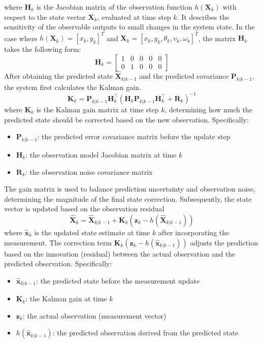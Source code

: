 \documentclass[12pt,a4paper]{article}
\numberwithin{equation}{section}
\begin{document}
\noindent where $\mathbf{H}_k$ is the Jacobian matrix of the observation function $h(\mathbf{X}_k)$ with respect to the state vector $\mathbf{X}_k$, evaluated at time step $k$. It describes the sensitivity of the observable outputs to small changes in the system state. In the case where $h(\mathbf{X}_k) = [x_k, y_k]^T$ and $\mathbf{X}_k = [x_k, y_k, \theta_k, v_k, \omega_k]^T$, the matrix $\mathbf{H}_k$ takes the following form:
\[
\mathbf{H}_k =
\begin{bmatrix}
1 & 0 & 0 & 0 & 0 \\
0 & 1 & 0 & 0 & 0
\end{bmatrix}
\]
After obtaining the predicted state \(\hat{\mathbf{X}}_{k|k-1}\) and the predicted covariance \(\mathbf{P}_{k|k-1}\), the system first calculates the Kalman gain.
\begin{equation}
\mathbf{K}_k = \mathbf{P}_{k|k-1} \mathbf{H}_k^\top 
\left( \mathbf{H}_k \mathbf{P}_{k|k-1} \mathbf{H}_k^\top + \mathbf{R}_k \right)^{-1}
\label{eq:kalman_gain}
\end{equation}
\noindent
where $\mathbf{K}_k$ is the Kalman gain matrix at time step $k$, determining how much the predicted state should be corrected based on the new observation. Specifically:
\begin{itemize}
  \item $\mathbf{P}_{k|k-1}$: the predicted error covariance matrix before the update step
  \item $\mathbf{H}_k$: the observation model Jacobian matrix at time $k$
  \item $\mathbf{R}_k$: the observation noise covariance matrix
\end{itemize}
The gain matrix is used to balance prediction uncertainty and observation noise, determining the magnitude of the final state correction. Subsequently, the state vector is updated based on the observation residual
\begin{equation}
\hat{\mathbf{X}}_k = \hat{\mathbf{X}}_{k|k-1} + \mathbf{K}_k 
\left( \mathbf{z}_k - h(\hat{\mathbf{X}}_{k|k-1}) \right)
\label{eq:state_update}
\end{equation}
\noindent
where $\hat{\mathbf{x}}_k$ is the updated state estimate at time $k$ after incorporating the measurement. The correction term $\mathbf{K}_k \left( \mathbf{z}_k - h(\hat{\mathbf{x}}_{k|k-1}) \right)$ adjusts the prediction based on the innovation (residual) between the actual observation and the predicted observation. Specifically:
\begin{itemize}
  \item $\hat{\mathbf{x}}_{k|k-1}$: the predicted state before the measurement update
  \item $\mathbf{K}_k$: the Kalman gain at time $k$
  \item $\mathbf{z}_k$: the actual observation (measurement vector)
  \item $h(\hat{\mathbf{x}}_{k|k-1})$: the predicted observation derived from the predicted state
\end{itemize}
\end{document}
